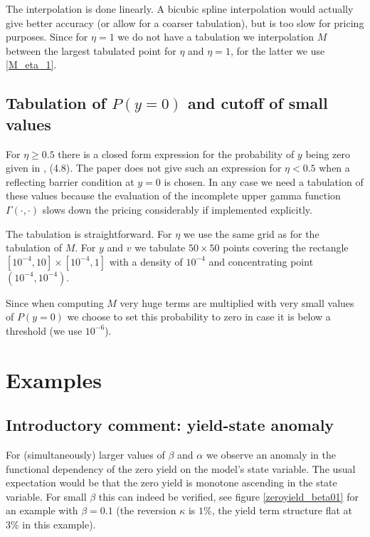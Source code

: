 \documentclass{amsart}
\theoremstyle{plain}
\numberwithin{equation}{section}
\begin{document}
The interpolation is done linearly. A bicubic spline interpolation would actually give better accuracy (or allow for a coarser tabulation), but is too slow for pricing purposes. Since for $\eta=1$ we do not have a tabulation we interpolation $M$ between the largest tabulated point for $\eta$ and $\eta=1$, for the latter we use \ref{M_eta_1}.

\subsection{Tabulation of $P(y = 0)$ and cutoff of small values}

For $\eta \geq 0.5$ there is a closed form expression for the probability of $y$ being zero given in \cite{betaeta}, (4.8). The paper does not give such an expression for $\eta<0.5$ when a reflecting barrier condition at $y=0$ is chosen. In any case we need a tabulation of these values because the evaluation of the incomplete upper gamma function $\Gamma(\cdot,\cdot)$ slows down the pricing considerably if implemented explicitly.

The tabulation is straightforward. For $\eta$ we use the same grid as for the tabulation of $M$. For $y$ and $v$ we tabulate $50 \times 50$ points covering the rectangle $[10^{-4},10] \times [10^{-4},1]$ with a density of $10^{-4}$ and concentrating point $(10^{-4},10^{-4})$.

Since when computing $M$ very huge terms are multiplied with very small values of $P(y=0)$ we choose to set this probability to zero in case it is below a threshold (we use $10^{-6}$).

\section{Examples}

\subsection{Introductory comment: yield-state anomaly}
\label{ys-anomaly}

For (simultaneously) larger values of $\beta$ and $\alpha$ we observe an anomaly in the functional dependency of the zero yield on the model's state variable. The usual expectation would be that the zero yield is monotone ascending in the state variable. For small $\beta$ this can indeed be verified, see figure \ref{zeroyield_beta01} for an example with $\beta=0.1$ (the reversion $\kappa$ is $1\%$, the yield term structure flat at $3\%$ in this example).
\end{document}
